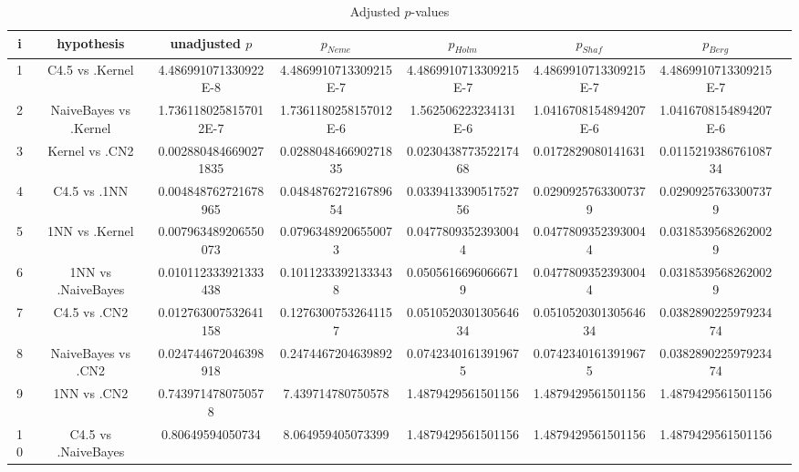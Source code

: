 \documentclass[a4paper,10pt]{article}
\begin{document}
\begin{landscape}
\begin{table}[!htp]
\centering\tiny
\caption{Adjusted $p$-values}
\begin{tabular}{cccccccc}
i&hypothesis&unadjusted $p$&$p_{Neme}$&$p_{Holm}$&$p_{Shaf}$&$p_{Berg}$\\
\hline
1&C4.5 vs .Kernel&4.486991071330922E-8&4.4869910713309215E-7&4.4869910713309215E-7&4.4869910713309215E-7&4.4869910713309215E-7\\
2&NaiveBayes vs .Kernel&1.7361180258157012E-7&1.7361180258157012E-6&1.562506223234131E-6&1.0416708154894207E-6&1.0416708154894207E-6\\
3&Kernel vs .CN2&0.0028804846690271835&0.028804846690271835&0.023043877352217468&0.0172829080141631&0.011521938676108734\\
4&C4.5 vs .1NN&0.004848762721678965&0.048487627216789654&0.033941339051752756&0.02909257633007379&0.02909257633007379\\
5&1NN vs .Kernel&0.007963489206550073&0.07963489206550073&0.04778093523930044&0.04778093523930044&0.03185395682620029\\
6&1NN vs .NaiveBayes&0.010112333921333438&0.10112333921333438&0.05056166960666719&0.04778093523930044&0.03185395682620029\\
7&C4.5 vs .CN2&0.012763007532641158&0.12763007532641157&0.051052030130564634&0.051052030130564634&0.038289022597923474\\
8&NaiveBayes vs .CN2&0.024744672046398918&0.2474467204639892&0.07423401613919675&0.07423401613919675&0.038289022597923474\\
9&1NN vs .CN2&0.7439714780750578&7.439714780750578&1.4879429561501156&1.4879429561501156&1.4879429561501156\\
10&C4.5 vs .NaiveBayes&0.80649594050734&8.064959405073399&1.4879429561501156&1.4879429561501156&1.4879429561501156\\
\hline
\end{tabular}
\end{table}

\end{landscape}
\end{document}
